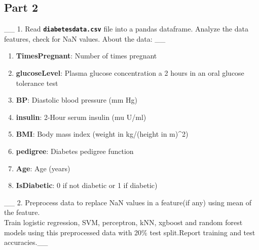 \documentclass[11pt]{article}
\providecommand{\tightlist}{%
      \setlength{\itemsep}{0pt}\setlength{\parskip}{0pt}}
\begin{document}
    \hypertarget{part-2}{%
\subsection{Part 2}\label{part-2}}

    \_\_ 1. Read \textbf{\texttt{diabetesdata.csv}} file into a pandas
dataframe. Analyze the data features, check for NaN values. About the
data: \_\_

\begin{enumerate}
\def\labelenumi{\arabic{enumi}.}
\tightlist
\item
  \textbf{TimesPregnant}: Number of times pregnant
\item
  \textbf{glucoseLevel}: Plasma glucose concentration a 2 hours in an
  oral glucose tolerance test
\item
  \textbf{BP}: Diastolic blood pressure (mm Hg)\\
\item
  \textbf{insulin}: 2-Hour serum insulin (mu U/ml)
\item
  \textbf{BMI}: Body mass index (weight in kg/(height in m)\^{}2)
\item
  \textbf{pedigree}: Diabetes pedigree function
\item
  \textbf{Age}: Age (years)
\item
  \textbf{IsDiabetic}: 0 if not diabetic or 1 if diabetic)
\end{enumerate}

\_\_ 2. Preprocess data to replace NaN values in a feature(if any) using
mean of the feature.\\
Train logistic regression, SVM, perceptron, kNN, xgboost and random
forest models using this preprocessed data with 20\% test split.Report
training and test accuracies.\_\_
\end{document}
